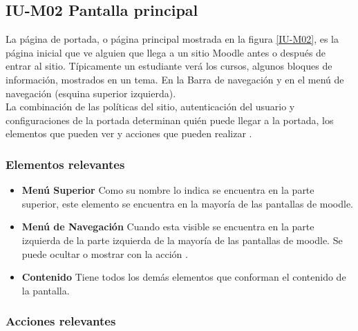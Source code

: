 
\subsection{IU-M02 Pantalla principal}

 La página de portada, o página principal mostrada en la figura \ref{IU-M02}, es la
 página inicial que ve alguien que llega a un sitio Moodle antes o después de entrar al sitio.
 Típicamente un estudiante verá los cursos, algunos bloques de información, mostrados en un tema.
 En la Barra de navegación y en el menú de navegación (esquina superior izquierda).\\

 \noindent 
 La combinación de las políticas del sitio, autenticación del usuario y configuraciones de la
 portada determinan quién puede llegar a la portada, los elementos que pueden ver y acciones
 que pueden realizar \cite{MoodlePortada}.


\subsubsection{Elementos relevantes}

    \begin{itemize}
    \item
    {\bf Menú Superior}
        Como su nombre lo indica se encuentra en la parte superior, este elemento se
        encuentra en la mayoría de las pantallas de moodle.

    \item
    {\bf Menú de Navegación}
        Cuando esta visible se encuentra en la parte izquierda de la parte izquierda
        de la mayoría de las pantallas de moodle. Se puede ocultar o mostrar con la
        acción \IUMenu[].

    \item
    {\bf Contenido}
        Tiene todos los demás elementos que conforman el contenido de la pantalla.

    \end{itemize}

\subsubsection{Acciones relevantes}

